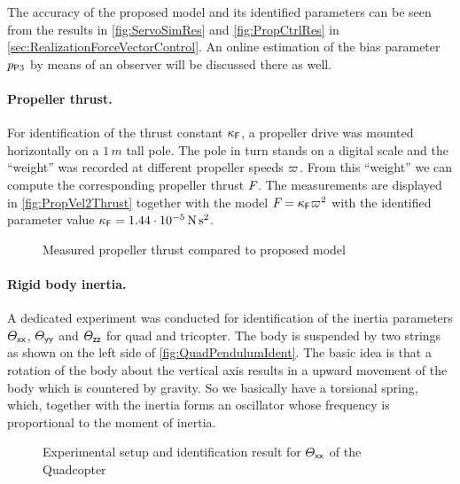 The accuracy of the proposed model and its identified parameters can be seen from the results in \autoref{fig:ServoSimRes} and \autoref{fig:PropCtrlRes} in \autoref{sec:RealizationForceVectorControl}.
An online estimation of the bias parameter $\PropParam[3]$ by means of an observer will be discussed there as well.

\paragraph*{Propeller thrust.}
For identification of the thrust constant $\kappaF$, a propeller drive was mounted horizontally on a $1\,\unit{m}$ tall pole.
The pole in turn stands on a digital scale and the ``weight'' was recorded at different propeller speeds $\PropVel$.
From this ``weight'' we can compute the corresponding propeller thrust $\PropForce$.
The measurements are displayed in \autoref{fig:PropVel2Thrust} together with the model $\PropForce = \kappaF \PropVel^2$ with the identified parameter value $\kappaF = 1.44 \cdot 10^{-5}\,\unit{N}\,\unit{s}^2$.

\begin{figure}
 \centering
 \footnotesize%
 \caption{Measured propeller thrust compared to proposed model}
 \label{fig:PropVel2Thrust}
\end{figure}

\paragraph*{Rigid body inertia.}
A dedicated experiment was conducted for identification of the inertia parameters $\Jxx$, $\Jyy$ and $\Jzz$ for quad and tricopter.
The body is suspended by two strings as shown on the left side of \autoref{fig:QuadPendulumIdent}.
The basic idea is that a rotation of the body about the vertical axis results in a upward movement of the body which is countered by gravity.
So we basically have a torsional spring, which, together with the inertia forms an oscillator whose frequency is proportional to the moment of inertia.

\begin{figure}
 \centering
 
 \hfill
 \footnotesize%
 \caption{Experimental setup and identification result for $\Jxx$ of the Quadcopter}
 \label{fig:QuadPendulumIdent}
\end{figure}

